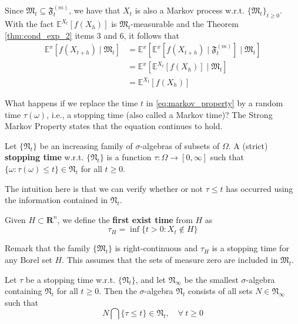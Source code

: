 Since $\mathfrak{M}_t \subseteq \mathfrak{F}_t^{(m)}$, we have that $X_t$ is also a Markov process w.r.t. $\{ \mathfrak{M}_t \}_{t \geq 0}$. With the fact $\mathbb{E}^{X_t} [f(X_{h})]$ is $\mathfrak{M}_t$-measurable and the Theorem \ref{thm:cond_exp_2} items 3 and 6, it follows that 
\begin{equation*}
    \begin{aligned}
        \mathbb{E}^x [ f(X_{t+h}) \mid \mathfrak{M}_t] &= \mathbb{E}^x[ \mathbb{E}^x [f(X_{t+h}) \mid \mathfrak{F}_t^{(m)}] \mid \mathfrak{M}_t] \\
        &= \mathbb{E}^x[\mathbb{E}^{X_t} [f(X_{h})] \mid \mathfrak{M}_t] \\ 
        &= \mathbb{E}^{X_t} [f(X_{h})]
    \end{aligned}
\end{equation*}

What happens if we replace the time $t$ in \eqref{eq:markov_property} by a random time $\tau(\omega)$, i.e., a stopping time (also called a Markov time)? The Strong Markov Property states that the equation continues to hold. 

\begin{definition}
    Let $\{ \mathfrak{N}_t \}$ be an increasing family of $\sigma$-algebras of subsets of $\Omega$. A (strict) \textbf{stopping time} w.r.t. $\{ \mathfrak{N}_t \}$ is a function $\tau : \Omega \longrightarrow [0, \infty]$ such that $\{ \omega : \tau(\omega) \leq t \} \in \mathfrak{N}_t$ for all $t \geq 0$.
\end{definition}

The intuition here is that we can verify whether or not $\tau \leq t$ has occurred using the information contained in $\mathfrak{N}_t$. 

Given $H \subset \textbf{R}^n$, we define the \textbf{first exist time} from $H$ as 
\[
    \tau_H = \inf \{ t > 0 : X_t \notin H \}
\]

Remark that the family $\{ \mathfrak{M}_t \}$ is right-continuous and $\tau_H$ is a stopping time for any Borel set $H$. This assumes that the sets of measure zero are included in $\mathfrak{M}_t$.

\begin{definition}
    Let $\tau$ be a stopping time w.r.t. $\{ \mathfrak{N}_t \}$, and let $\mathfrak{N}_\infty$ be the smallest $\sigma$-algebra containing $\mathfrak{N}_t$ for all $t \geq 0$. Then the $\sigma$-algebra $\mathfrak{N}_t$ consists of all sets $N \in \mathfrak{N}_\infty$ such that 
    \[
        N \bigcap \{ \tau \leq t \} \in \mathfrak{N}_t, \quad \forall ~t\geq 0
    \]
\end{definition}

